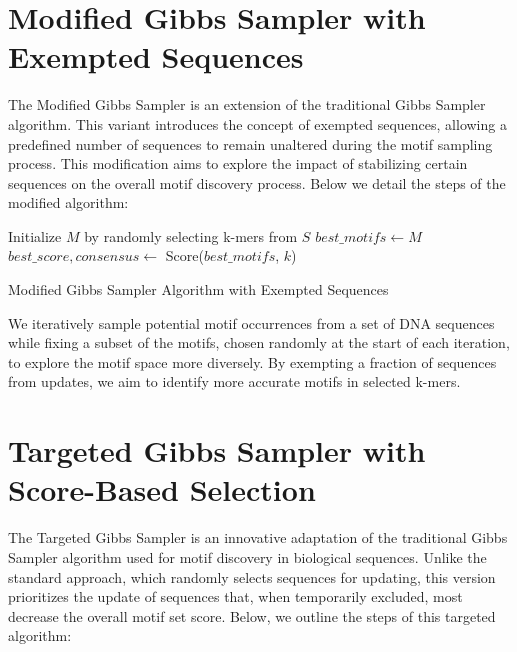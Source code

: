 \documentclass{report}
\begin{document}
\section{Modified Gibbs Sampler with Exempted Sequences}
The Modified Gibbs Sampler is an extension of the traditional Gibbs Sampler algorithm. This variant introduces the concept of exempted sequences, allowing a predefined number of sequences to remain unaltered during the motif sampling process. This modification aims to explore the impact of stabilizing certain sequences on the overall motif discovery process. Below we detail the steps of the modified algorithm:

\begin{algorithm}[H]
    \SetAlgoLined
    Initialize $M$ by randomly selecting k-mers from $S$\;
    $best\_motifs \gets M$\;
    $best\_score, consensus \gets$ Score($best\_motifs$, $k$)\;
    \;
\caption{Modified Gibbs Sampler Algorithm with Exempted Sequences}
\end{algorithm}

We iteratively sample potential motif occurrences from a set of DNA sequences while fixing a subset of the motifs, chosen randomly at the start of each iteration, to explore the motif space more diversely. By exempting a fraction of sequences from updates, we aim to identify more accurate motifs in selected k-mers.
\newpage

\section{Targeted Gibbs Sampler with Score-Based Selection}
The Targeted Gibbs Sampler is an innovative adaptation of the traditional Gibbs Sampler algorithm used for motif discovery in biological sequences. Unlike the standard approach, which randomly selects sequences for updating, this version prioritizes the update of sequences that, when temporarily excluded, most decrease the overall motif set score. Below, we outline the steps of this targeted algorithm:
\end{document}
